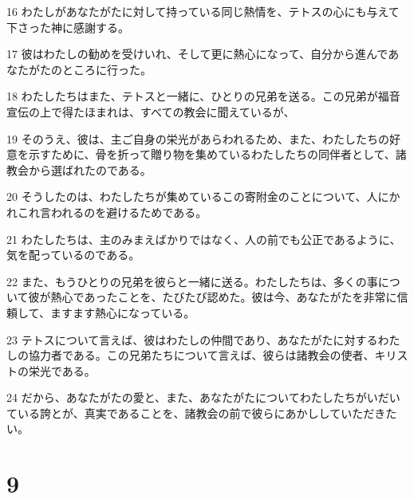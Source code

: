 \par 16 わたしがあなたがたに対して持っている同じ熱情を、テトスの心にも与えて下さった神に感謝する。
\par 17 彼はわたしの勧めを受けいれ、そして更に熱心になって、自分から進んであなたがたのところに行った。
\par 18 わたしたちはまた、テトスと一緒に、ひとりの兄弟を送る。この兄弟が福音宣伝の上で得たほまれは、すべての教会に聞えているが、
\par 19 そのうえ、彼は、主ご自身の栄光があらわれるため、また、わたしたちの好意を示すために、骨を折って贈り物を集めているわたしたちの同伴者として、諸教会から選ばれたのである。
\par 20 そうしたのは、わたしたちが集めているこの寄附金のことについて、人にかれこれ言われるのを避けるためである。
\par 21 わたしたちは、主のみまえばかりではなく、人の前でも公正であるように、気を配っているのである。
\par 22 また、もうひとりの兄弟を彼らと一緒に送る。わたしたちは、多くの事について彼が熱心であったことを、たびたび認めた。彼は今、あなたがたを非常に信頼して、ますます熱心になっている。
\par 23 テトスについて言えば、彼はわたしの仲間であり、あなたがたに対するわたしの協力者である。この兄弟たちについて言えば、彼らは諸教会の使者、キリストの栄光である。
\par 24 だから、あなたがたの愛と、また、あなたがたについてわたしたちがいだいている誇とが、真実であることを、諸教会の前で彼らにあかししていただきたい。

\chapter{9}

